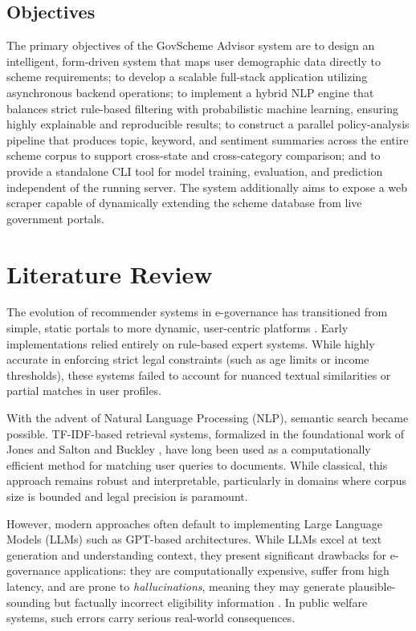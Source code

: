 \documentclass[10pt, journal, twocolumn]{IEEEtran}
\begin{document}
\subsection{Objectives}
The primary objectives of the GovScheme Advisor system are to design an intelligent, form-driven system that maps user demographic data directly to scheme requirements; to develop a scalable full-stack application utilizing asynchronous backend operations; to implement a hybrid NLP engine that balances strict rule-based filtering with probabilistic machine learning, ensuring highly explainable and reproducible results; to construct a parallel policy-analysis pipeline that produces topic, keyword, and sentiment summaries across the entire scheme corpus to support cross-state and cross-category comparison; and to provide a standalone CLI tool for model training, evaluation, and prediction independent of the running server. The system additionally aims to expose a web scraper capable of dynamically extending the scheme database from live government portals.

\section{Literature Review}
The evolution of recommender systems in e-governance has transitioned from simple, static portals to more dynamic, user-centric platforms \cite{aggarwal2016}. Early implementations relied entirely on rule-based expert systems. While highly accurate in enforcing strict legal constraints (such as age limits or income thresholds), these systems failed to account for nuanced textual similarities or partial matches in user profiles.

With the advent of Natural Language Processing (NLP), semantic search became possible. TF-IDF-based retrieval systems, formalized in the foundational work of Jones \cite{jones1972} and Salton and Buckley \cite{salton1988}, have long been used as a computationally efficient method for matching user queries to documents. While classical, this approach remains robust and interpretable, particularly in domains where corpus size is bounded and legal precision is paramount.

However, modern approaches often default to implementing Large Language Models (LLMs) such as GPT-based architectures. While LLMs excel at text generation and understanding context, they present significant drawbacks for e-governance applications: they are computationally expensive, suffer from high latency, and are prone to \textit{hallucinations}, meaning they may generate plausible-sounding but factually incorrect eligibility information \cite{ji2023hallucination}. In public welfare systems, such errors carry serious real-world consequences.
\end{document}
